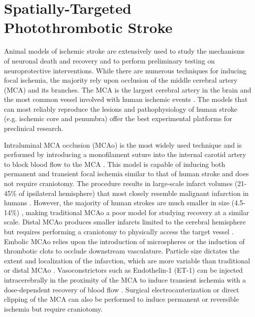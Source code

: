 
\chapter{Spatially-Targeted Photothrombotic Stroke} \label{ch:photothrombosis}

Animal models of ischemic stroke are extensively used to study the mechanisms of neuronal death and recovery and to perform preliminary testing on neuroprotective interventions. While there are numerous techniques for inducing focal ischemia, the majority rely upon occlusion of the middle cerebral artery (MCA) and its branches. The MCA is the largest cerebral artery in the brain and the most common vessel involved with human ischemic events \cite{Sicard:2009ku}. The models that can most reliably reproduce the lesions and pathophysiology of human stroke (e.g. ischemic core and penumbra) offer the best experimental platforms for preclinical research.

Intraluminal MCA occlusion (MCAo) is the most widely used technique and is performed by introducing a monofilament suture into the internal carotid artery to block blood flow to the MCA \cite{Kozuimi:1986bd}. This model is capable of inducing both permanent and transient focal ischemia similar to that of human stroke and does not require craniotomy. The procedure results in large-scale infarct volumes (21-45\% of ipsilateral hemisphere) that most closely resemble malignant infarction in humans \cite{Carmichael:2005gk}. However, the majority of human strokes are much smaller in size (4.5-14\%) \cite{Carmichael:2005gk, Brott:1989bl}, making traditional MCAo a poor model for studying recovery at a similar scale. Distal MCAo produces smaller infarcts limited to the cerebral hemisphere but requires performing a craniotomy to physically access the target vessel \cite{Doyle:2014bz}. Embolic MCAo relies upon the introduction of microspheres or the induction of thrombotic clots to occlude downstream vasculature. Particle size dictates the extent and localization of the infarction, which are more variable than traditional or distal MCAo \cite{Carmichael:2005gk}. Vasoconstrictors such as Endothelin-1 (ET-1) can be injected intracerebrally in the proximity of the MCA to induce transient ischemia with a dose-dependent recovery of blood flow \cite{Sicard:2009ku}. Surgical electrocauterization or direct clipping of the MCA can also be performed to induce permanent or reversible ischemia but require craniotomy.

